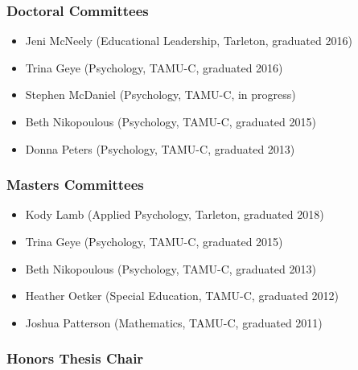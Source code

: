\documentclass[article,10pt]{article}
\begin{document}
\subsubsection*{Doctoral Committees}
\label{sec:org951141c}

\begin{itemize}
\item Jeni McNeely (Educational Leadership, Tarleton, graduated 2016)
\item Trina Geye (Psychology, TAMU-C, graduated 2016)
\item Stephen McDaniel (Psychology, TAMU-C, in progress)
\item Beth Nikopoulous (Psychology, TAMU-C, graduated 2015)
\item Donna Peters (Psychology, TAMU-C, graduated 2013)
\end{itemize}

\subsubsection*{Masters Committees}
\label{sec:orga428c61}

\begin{itemize}
\item Kody Lamb (Applied Psychology, Tarleton, graduated 2018)
\item Trina Geye (Psychology, TAMU-C, graduated 2015)
\item Beth Nikopoulous (Psychology, TAMU-C, graduated 2013)
\item Heather Oetker (Special Education, TAMU-C, graduated 2012)
\item Joshua Patterson (Mathematics, TAMU-C, graduated 2011)
\end{itemize}

\subsubsection*{Honors Thesis Chair}
\label{sec:org998c4d1}
\end{document}
